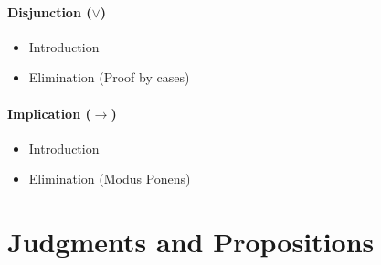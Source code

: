 \paragraph{Disjunction ($\lor$)}
\begin{itemize}
    \item Introduction
          \begin{minipage}[t]{0.5\textwidth}
    \begin{prooftree}
    \end{prooftree}
      \end{minipage}\hfill
      \begin{minipage}[t]{0.5\textwidth}
    \begin{prooftree}
    \end{prooftree}
      \end{minipage}
    \item Elimination (Proof by cases)
    \begin{prooftree}
    \end{prooftree}
\end{itemize}
\paragraph{Implication ($\to$)}
\begin{itemize}
    \item Introduction
    \begin{prooftree}
    \end{prooftree}
    \item Elimination (Modus Ponens)
    \begin{prooftree}
    \end{prooftree}
\end{itemize}



\section{Judgments and Propositions}

